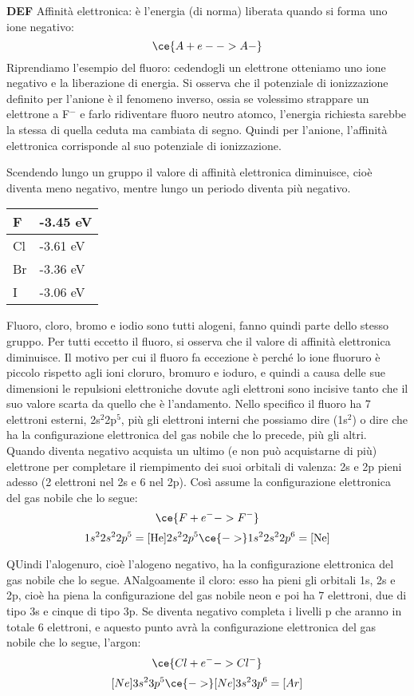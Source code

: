 \textbf{DEF} Affinità elettronica: è l'energia (di norma) liberata quando si forma uno ione negativo:
$$\ce{ A + e- -> A-}$$ 
Riprendiamo l'esempio del fluoro: cedendogli un elettrone otteniamo uno ione negativo e la liberazione di energia. Si osserva che il potenziale di ionizzazione definito per l'anione è il fenomeno inverso, ossia se volessimo strappare un elettrone a F$^-$ e farlo ridiventare fluoro neutro atomco, l'energia richiesta sarebbe la stessa di quella ceduta ma cambiata di segno. Quindi per l'anione, l'affinità elettronica corrisponde al suo potenziale di ionizzazione.

Scendendo lungo un gruppo il valore di affinità elettronica diminuisce, cioè diventa meno negativo, mentre lungo un periodo diventa più negativo.
\begin{center}
    \begin{tabular}{ m{1cm}|m{2cm} } 
     F & -3.45 eV \\ 
     \hline
     Cl & -3.61 eV \\
     \hline
     Br & -3.36 eV \\ 
     \hline
     I & -3.06 eV \\
     \hline
    \end{tabular}
    \end{center}
Fluoro, cloro, bromo e iodio sono tutti alogeni, fanno quindi parte dello stesso gruppo. Per tutti eccetto il fluoro, si osserva che il valore di affinità elettronica diminuisce. Il motivo per cui il fluoro fa eccezione è perché lo ione fluoruro è piccolo rispetto agli ioni cloruro, bromuro e ioduro, e quindi a causa delle sue dimensioni le repulsioni elettroniche dovute agli elettroni sono incisive tanto che il suo valore scarta da quello che è l'andamento. Nello specifico il fluoro ha 7 elettroni esterni, 2s$^2$2p$^5$, più gli elettroni interni che possiamo dire (1s$^2$) o dire che ha la configurazione elettronica del gas nobile che lo precede, più gli altri. Quando diventa negativo acquista un ultimo (e non può acquistarne di più) elettrone per completare il riempimento dei suoi orbitali di valenza: 2s e 2p pieni adesso (2 elettroni nel 2s e 6 nel 2p). Così assume la configurazione elettronica del gas nobile che lo segue:
$$\ce{F + e^- -> F^-}$$
$$1s^22s^22p^5= \text{[He]}2s^22p^5\ce{->}1s^22s^22p^6=\text{[Ne]}$$

QUindi l'alogenuro, cioè l'alogeno negativo, ha la configurazione elettronica del gas nobile che lo segue. ANalgoamente il cloro: esso ha pieni gli orbitali 1s, 2s e 2p, cioè ha piena la configurazione del gas nobile neon e poi ha 7 elettroni, due di tipo 3s e cinque di tipo 3p. Se diventa negativo completa i livelli p che aranno in totale 6 elettroni, e aquesto punto avrà la configurazione elettronica del gas nobile che lo segue, l'argon:
$$\ce{Cl+e^- -> Cl^-}$$
$$[Ne]3s^23p^5 \ce{->} [Ne]3s^23p^6=[Ar]$$

